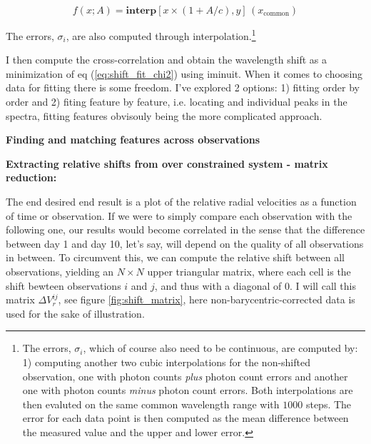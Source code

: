     \begin{equation}
        f(x; A) = \textbf{interp}[x \times ( 1 + A/c), y]\,(x_\text{common})
    \end{equation}

    The errors, $\sigma_i$, are also computed through interpolation.\footnote{The errors, $\sigma_i$, which of course also need to be continuous, are computed by: 1) computing another two cubic interpolations for the non-shifted observation, one with photon counts \emph{plus} photon count errors and another one with photon counts \emph{minus} photon count errors. Both interpolations are then evaluted on the same common wavelength range with $1000$ steps. The error for each data point is then computed as the mean difference between the measured value and the upper and lower error.}
    
    I then compute the cross-correlation and obtain the wavelength shift as a minimization of eq (\ref{eq:shift_fit_chi2}) using iminuit. When it comes to choosing data for fitting there is some freedom. I've explored 2 options: 1) fitting order by order and 2) fiting feature by feature, i.e. locating and individual peaks in the spectra, fitting features obvisouly being the more complicated approach. 
    
    \bigbreak
    \noindent\textbf{Finding and matching features across observations}
    
    \todo{}

    \bigbreak
    \noindent\textbf{Extracting relative shifts from over constrained system - matrix reduction:}
    
    The end desired end result is a plot of the relative radial velocities as a function of time or observation. If we were to simply compare each observation with the following one, our results would become correlated in the sense that the difference between day 1 and day 10, let's say, will depend on the quality of all observations in between. To circumvent this, we can compute the relative shift between all observations, yielding an $N\times N$ upper triangular matrix, where each cell is the shift bewteen observations $i$ and $j$, and thus with a diagonal of 0. I will call this matrix $\Delta V_r^{ij}$, see figure \ref*{fig:shift_matrix}, here non-barycentric-corrected data is used for the sake of illustration. 
    
